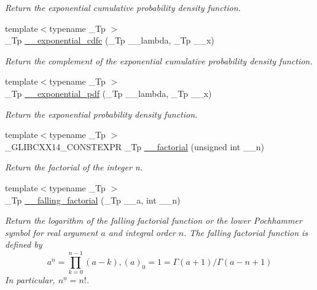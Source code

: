 \begin{DoxyCompactItemize}
\begin{DoxyCompactList}\small\item\em Return the exponential cumulative probability density function. \end{DoxyCompactList}\item 
{\footnotesize template$<$typename \+\_\+\+Tp $>$ }\\\+\_\+\+Tp \hyperlink{namespacestd_1_1____detail_a4e72483dfbfe8c866974d89f9aeb4b28}{\+\_\+\+\_\+exponential\+\_\+cdfc} (\+\_\+\+Tp \+\_\+\+\_\+lambda, \+\_\+\+Tp \+\_\+\+\_\+x)
\begin{DoxyCompactList}\small\item\em Return the complement of the exponential cumulative probability density function. \end{DoxyCompactList}\item 
{\footnotesize template$<$typename \+\_\+\+Tp $>$ }\\\+\_\+\+Tp \hyperlink{namespacestd_1_1____detail_add35fd0c4c00f412c0fab7b6018ce2cd}{\+\_\+\+\_\+exponential\+\_\+pdf} (\+\_\+\+Tp \+\_\+\+\_\+lambda, \+\_\+\+Tp \+\_\+\+\_\+x)
\begin{DoxyCompactList}\small\item\em Return the exponential probability density function. \end{DoxyCompactList}\item 
{\footnotesize template$<$typename \+\_\+\+Tp $>$ }\\\+\_\+\+G\+L\+I\+B\+C\+X\+X14\+\_\+\+C\+O\+N\+S\+T\+E\+X\+PR \+\_\+\+Tp \hyperlink{namespacestd_1_1____detail_a8de5d6069cbef126684be0800f47f8b2}{\+\_\+\+\_\+factorial} (unsigned int \+\_\+\+\_\+n)
\begin{DoxyCompactList}\small\item\em Return the factorial of the integer n. \end{DoxyCompactList}\item 
{\footnotesize template$<$typename \+\_\+\+Tp $>$ }\\\+\_\+\+Tp \hyperlink{namespacestd_1_1____detail_a62ddf0f8d9467f4c3f2cc0b500ca1272}{\+\_\+\+\_\+falling\+\_\+factorial} (\+\_\+\+Tp \+\_\+\+\_\+a, int \+\_\+\+\_\+n)
\begin{DoxyCompactList}\small\item\em Return the logarithm of the falling factorial function or the lower Pochhammer symbol for real argument $ a $ and integral order $ n $. The falling factorial function is defined by \[ a^{\underline{n}} = \prod_{k=0}^{n-1} (a - k), (a)_0 = 1 = \Gamma(a + 1) / \Gamma(a - n + 1) \] In particular, $ n^{\underline{n}} = n! $. \end{DoxyCompactList}\item 

\end{DoxyCompactItemize}
